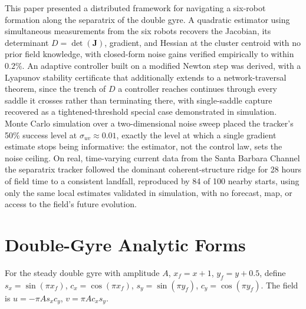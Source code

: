 \documentclass[lettersize,journal]{IEEEtran}
\begin{document}
This paper presented a distributed framework for navigating a six-robot
formation along the separatrix of the double gyre. A quadratic
estimator using simultaneous measurements from the six robots recovers the
Jacobian, its determinant $D = \det(\mathbf{J})$, gradient, and Hessian at
the cluster centroid with no prior field knowledge, with closed-form noise
gains verified empirically to within $0.2\%$. An adaptive controller built
on a modified Newton step was derived, with a Lyapunov stability
certificate that additionally extends to a network-traversal theorem,
since the trench of $D$ a controller reaches continues through every
saddle it crosses rather than terminating there, with single-saddle
capture recovered as a tightened-threshold special case demonstrated in
simulation. Monte Carlo simulation over a two-dimensional noise sweep
placed the tracker's 50\% success level at $\sigma_{uv} \approx 0.01$,
exactly the level at which a single gradient estimate stops being
informative: the estimator, not the control law, sets the noise ceiling.
On real, time-varying current data from the Santa Barbara Channel the
separatrix tracker followed the dominant coherent-structure ridge for
28 hours of field time to a consistent landfall, reproduced by 84 of
100 nearby starts, using only the same local estimates validated in
simulation, with no forecast, map, or access to the field's future
evolution.


\appendices

\section{Double-Gyre Analytic Forms}
\label{app:analytic}

For the steady double gyre with amplitude $A$, $x_f = x + 1$,
$y_f = y + 0.5$, define $s_x = \sin(\pi x_f)$, $c_x = \cos(\pi x_f)$,
$s_y = \sin(\pi y_f)$, $c_y = \cos(\pi y_f)$. The field is
$u = -\pi A s_x c_y$, $v = \pi A c_x s_y$.
\end{document}
